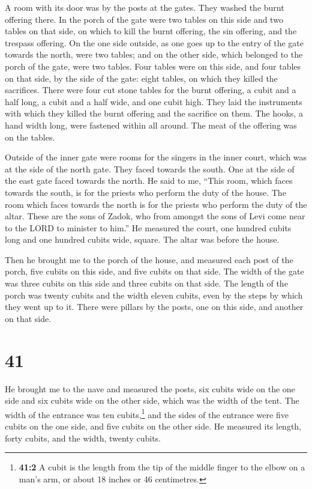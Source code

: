  A room with its door was by the posts at the gates. They
washed the burnt offering there.  In the porch of the
gate were two tables on this side and two tables on that side, on which
to kill the burnt offering, the sin offering, and the trespass offering.
 On the one side outside, as one goes up to the entry of
the gate towards the north, were two tables; and on the other side,
which belonged to the porch of the gate, were two tables.
 Four tables were on this side, and four tables on that
side, by the side of the gate: eight tables, on which they killed the
sacrifices.  There were four cut stone tables for the
burnt offering, a cubit and a half long, a cubit and a half wide, and
one cubit high. They laid the instruments with which they killed the
burnt offering and the sacrifice on them.  The hooks, a
hand width long, were fastened within all around. The meat of the
offering was on the tables.

 Outside of the inner gate were rooms for the singers in
the inner court, which was at the side of the north gate. They faced
towards the south. One at the side of the east gate faced towards the
north.  He said to me, ``This room, which faces towards
the south, is for the priests who perform the duty of the house.
 The room which faces towards the north is for the
priests who perform the duty of the altar. These are the sons of Zadok,
who from amongst the sons of Levi come near to the LORD to minister to
him.''  He measured the court, one hundred cubits long
and one hundred cubits wide, square. The altar was before the house.

 Then he brought me to the porch of the house, and
measured each post of the porch, five cubits on this side, and five
cubits on that side. The width of the gate was three cubits on this side
and three cubits on that side.  The length of the porch
was twenty cubits and the width eleven cubits, even by the steps by
which they went up to it. There were pillars by the posts, one on this
side, and another on that side.

\hypertarget{section-39}{%
\section{41}\label{section-39}}

 He brought me to the nave and measured the posts, six
cubits wide on the one side and six cubits wide on the other side, which
was the width of the tent.  The width of the entrance was
ten cubits,\footnote{\textbf{41:2} A cubit is the length from the tip of
  the middle finger to the elbow on a man's arm, or about 18 inches or
  46 centimetres.} and the sides of the entrance were five cubits on the
one side, and five cubits on the other side. He measured its length,
forty cubits, and the width, twenty cubits.

